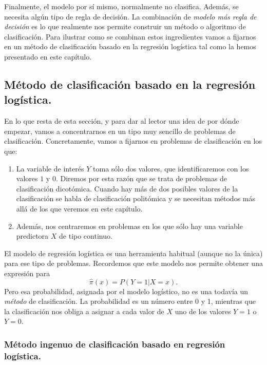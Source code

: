 Finalmente, el modelo por sí mismo, normalmente no clasifica. Además, se necesita algún tipo de regla de decisión. La combinación de {\em modelo más regla de decisión} es lo que realmente nos permite construir un método o algoritmo de clasificación. Para ilustrar como se combinan estos ingredientes vamos a fijarnos en un método de clasificación basado en la regresión logística tal como la hemos presentado en este capítulo.

\subsection{Método de clasificación basado en la regresión logística.}

En lo que resta de esta sección, y para dar al lector una idea de por dónde empezar,  vamos a concentrarnos en un tipo muy sencillo de problemas de clasificación. Concretamente, vamos a fijarnos en problemas de clasificación en los que:
\begin{enumerate}
	\item La variable de interés $Y$ toma sólo dos valores, que identificaremos con los valores $1$ y $0$. Diremos por esta razón que se trata de problemas de {\sf clasificación dicotómica}. Cuando hay más de dos posibles valores de la clasificación se habla de {\sf clasificación  politómica} y se necesitan métodos  más allá de los que veremos en este capítulo.
	\item Además, nos centraremos en problemas en los que sólo hay una variable predictora $X$ de tipo continuo.
\end{enumerate}
El modelo de regresión logística es una herramienta habitual (aunque no la única) para ese tipo de problemas. Recordemos que este modelo nos permite obtener una expresión para
\[\hat\pi(x) = P(Y=1|X=x).\]
Pero esa probabilidad, asignada por el modelo logístico,  no es una todavía un {\em método} de clasificación. La probabilidad es un número entre 0 y 1, mientras que la clasificación nos obliga a asignar a cada valor de $X$ uno de los valores $Y=1$ o $Y=0$.

\subsubsection*{Método ingenuo de clasificación basado en regresión logística.}
\label{cap13:subsubsec:MetodoIngenuoClasificacion}

